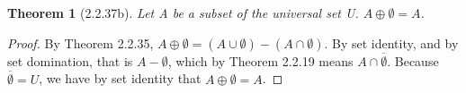 \documentclass[a4paper, 12pt]{article}
\theoremstyle{plain}
\newtheorem*{theorem*}{Theorem}
\begin{document}
	
	\begin{theorem*}[2.2.37b]
		Let A be a subset of the universal set U. $A \oplus \emptyset = A$.
	\end{theorem*}
	
	\begin{proof}
		By Theorem 2.2.35, $A \oplus \emptyset = (A \cup \emptyset) - (A \cap \emptyset)$. By set 
		identity, and by set domination, that is $A - \emptyset$, which by Theorem 2.2.19 means 
		$A \cap \overline{\emptyset}$. Because $\overline{\emptyset} = U$, we have by set identity 
		that $A \oplus \emptyset = A$.
	\end{proof}
\end{document}
